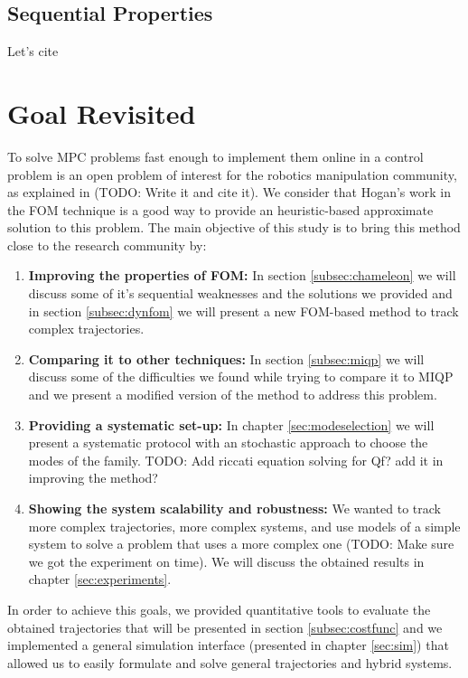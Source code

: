 \documentclass[12,twoside]{TFG-GM}
\theoremstyle{definition}
\theoremstyle{remark}
\begin{document}
\subsection{Sequential Properties}
\label{subsec:sequential}
Let's cite \cite{seq}

\section{Goal Revisited}
\label{goal}

To solve MPC problems fast enough to implement them online in a control problem is an open problem of interest for the robotics manipulation community, as explained in (TODO: Write it and cite it). We consider that Hogan's work in the FOM technique is a good way to provide an heuristic-based approximate solution to this problem. The main objective of this study is to bring this method close to the research community by:
\begin{enumerate}
\item {\textbf{Improving the properties of FOM:}} In section \ref{subsec:chameleon} we will discuss some of it's sequential weaknesses and the solutions we provided and in section \ref{subsec:dynfom} we will present a new FOM-based method to track complex trajectories.
\item{\textbf{Comparing it to other techniques:}} In section \ref{subsec:miqp} we will discuss some of the difficulties we found while trying to compare it to MIQP and we present a modified version of the method to address this problem.
\item{\textbf{Providing a systematic set-up:}} In chapter \ref{sec:modeselection} we will present a systematic protocol with an stochastic approach to choose the modes of the family. TODO: Add riccati equation solving for Qf? add it in improving the method?
\item{\textbf{Showing the system scalability and robustness:}} We wanted to track more complex trajectories, more complex systems, and use models of a simple system to solve a problem that uses a more complex one (TODO: Make sure we got the experiment on time). We will discuss the obtained results in chapter \ref{sec:experiments}.
\end{enumerate} 

In order to achieve this goals, we provided quantitative tools to evaluate the obtained trajectories that will be presented in section \ref{subsec:costfunc} and we implemented a general simulation interface (presented in chapter \ref{sec:sim}) that allowed us to easily formulate and solve general trajectories and hybrid systems.
\end{document}
